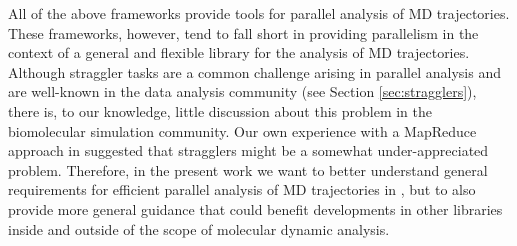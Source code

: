 All of the above frameworks provide tools for parallel analysis of MD trajectories. 
These frameworks, however, tend to fall short in providing parallelism in the context of a general and flexible library for the analysis of MD trajectories.
Although straggler tasks are a common challenge arising in parallel analysis and are well-known in the data analysis community (see Section \ref{sec:stragglers}), there is, to our knowledge, little discussion about this problem in the biomolecular simulation community.
Our own experience with a MapReduce approach in  \cite{Khoshlessan:2017ab} suggested that stragglers might be a somewhat under-appreciated problem.
Therefore, in the present work we want to better understand general requirements for efficient parallel analysis of MD trajectories in , but to also provide more general guidance that could benefit developments in other libraries inside and outside of the scope of molecular dynamic analysis.




